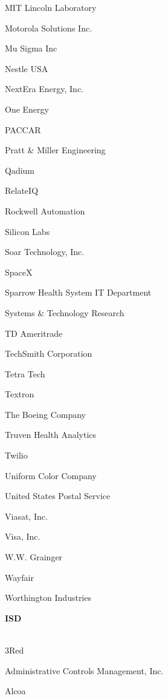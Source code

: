 \documentclass[twoside]{article}
\begin{document}
\begin{center}
\begin{multicols}{5}
\begin{FlushLeft}
\begin{compactitem}
\item MIT Lincoln Laboratory
\item Motorola Solutions Inc.
\item Mu Sigma Inc
\item Nestle USA
\item NextEra Energy, Inc.
\item One Energy
\item PACCAR
\item Pratt \& Miller Engineering
\item Qadium
\item RelateIQ
\item Rockwell Automation
\item Silicon Labs
\item Soar Technology, Inc.
\item SpaceX
\item Sparrow Health System IT Department
\item Systems \& Technology Research
\item TD Ameritrade
\item TechSmith Corporation
\item Tetra Tech
\item Textron
\item The Boeing Company
\item Truven Health Analytics
\item Twilio
\item Uniform Color Company
\item United States Postal Service
\item Viasat, Inc.
\item Visa, Inc.
\item W.W. Grainger
\item Wayfair
\item Worthington Industries
\end{compactitem}
        \end{FlushLeft}
        \vspace{1em}
        {\fontsize{14}{16}\selectfont \bf ISD}\\
        \vspace{-1em}
        ~\hrulefill~
        \vspace{-.9em}
        \begin{FlushLeft}
        \begin{compactitem}
        \item 3Red
\item Administrative Controls Management, Inc.
\item Alcoa

\end{compactitem}
\end{FlushLeft}
\end{multicols}
\end{center}
\end{document}
